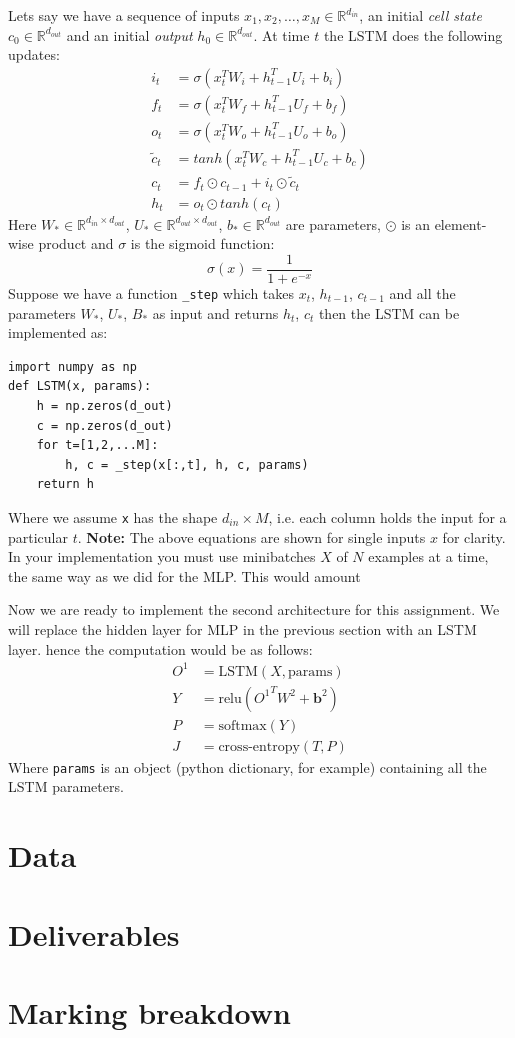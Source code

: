 \documentclass[12pt]{article}
\begin{document}
Lets say we have a sequence of inputs $x_1,x_2,\ldots,x_M \in \mathbb{R}^{d_{in}}$, an initial \textit{cell state} $c_0 \in \mathbb{R}^{d_{out}}$ and an initial \textit{output}
$h_0 \in \mathbb{R}^{d_{out}}$. At time $t$ the LSTM does the following updates:
\begin{align*}
    i_t &= \sigma(x_t^T W_{i} + h_{t-1}^T U_{i} + b_{i})\\
    f_t &= \sigma(x_t^T W_{f} + h_{t-1}^T U_{f} + b_{f})\\
    o_t &= \sigma(x_t^T W_{o} + h_{t-1}^T U_{o} + b_{o})\\
    \tilde{c}_t &= tanh(x_t^T W_{c} + h_{t-1}^T U_{c} + b_{c})\\
    c_t &= f_t \odot c_{t-1} + i_t \odot \tilde{c}_t\\
    h_t &= o_t \odot tanh(c_t)
\end{align*}
Here $W_* \in \mathbb{R}^{d_{in} \times d_{out}}$, $U_* \in \mathbb{R}^{d_{out} \times d_{out}}$, $b_* \in \mathbb{R}^{d_{out}}$ 
are parameters, $\odot$ is an element-wise product and $\sigma$ is the sigmoid function:
\begin{equation}
    \sigma(x) = \frac{1}{1+ e^{-x}}
\end{equation}
Suppose we have a function \texttt{\_step} which takes $x_t$, $h_{t-1}$, $c_{t-1}$ and all the parameters
$W_*$, $U_*$, $B_*$ as input and returns $h_t$, $c_t$
 then the LSTM can be implemented as:
\begin{verbatim}
import numpy as np
def LSTM(x, params):
    h = np.zeros(d_out)
    c = np.zeros(d_out)
    for t=[1,2,...M]:
        h, c = _step(x[:,t], h, c, params)
    return h
\end{verbatim}
Where we assume \texttt{x} has the shape $d_{in} \times M$, i.e. each column holds the input for a particular $t$.
\textbf{Note:} The above equations are shown for single inputs $x$ for clarity. In your implementation you must use
minibatches $X$ of $N$ examples at a time, the same way as we did for the MLP. This would amount 

Now we are ready to implement the second architecture for this assignment. We will replace the hidden layer for MLP
in the previous section with an LSTM layer. hence the computation would be as follows:
\begin{align*}
    O^1 &= \text{LSTM}(X, \text{params}) \\
    Y &= \text{relu}({O^1}^T W^2 + \mathbf{b}^2) \\
    P &= \text{softmax}(Y) \\
    J &= \text{cross-entropy}(T,P)
\end{align*}
Where \texttt{params} is an object (python dictionary, for example) containing all the LSTM parameters.

\section{Data}

\section{Deliverables}

\section{Marking breakdown}
\end{document}
